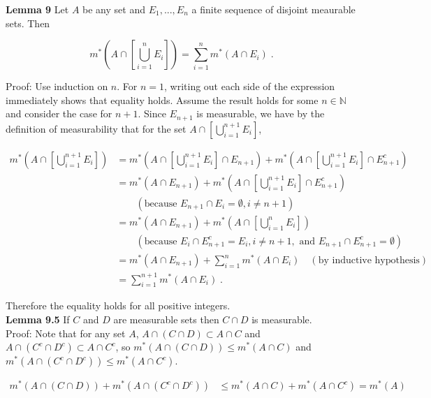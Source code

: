 \documentclass[a4paper]{article}
\begin{document}
{\bf Lemma 9} Let $A$ be any set and $E_1,..., E_n$ a finite sequence of disjoint meaurable sets. Then 

$$m^*\left(A\cap \left[\bigcup_{i=1}^n E_i\right]\right) =\sum_{i=1}^n m^*(A\cap E_i) \;. $$

Proof: Use induction on $n$. For $n = 1$, writing out each side of the expression immediately shows that equality holds. Assume the result holds for some $n \in \mathbb{N}$ and consider the case for $n+1$. Since $E_{n+1}$ is measurable, we have by the definition of measurability that for the set $A \cap \left[\bigcup_{i=1}^{n+1} E_i\right]$,

\begin{align*}
m^*\left(A\cap \left[\bigcup_{i=1}^{n+1} E_i\right]\right) &= m^*\left(A\cap \left[\bigcup_{i=1}^{n+1} E_i\right]\cap E_{n+1} \right) + m^*\left(A\cap \left[\bigcup_{i=1}^{n+1} E_i\right]\cap E_{n+1}^c \right)\\
&=m^*\left(A \cap E_{n+1} \right) + m^*\left(A\cap \left[\bigcup_{i=1}^{n+1} E_i\right]\cap E_{n+1}^c \right)\\
&\quad \quad (\text{because } E_{n+1} \cap E_i = \emptyset, i \neq n+1)\\
&=m^*\left(A \cap E_{n+1} \right) + m^*\left(A\cap \left[\bigcup_{i=1}^{n} E_i\right] \right)\\
&\quad \quad (\text{because } E_i \cap E_{n+1}^c = E_i, i\neq n+1, \text{ and } E_{n+1} \cap E_{n+1}^c = \emptyset )\\
&= m^*\left(A \cap E_{n+1} \right) +\sum_{i=1}^n m^*(A\cap E_i) \quad (\text{by inductive hypothesis})\\
&= \sum_{i=1}^{n+1} m^*(A\cap E_i) \;.
\end{align*}

Therefore the equality holds for all positive integers. \\

{\bf Lemma 9.5} If $C$ and $D$ are measurable sets then $C\cap D$ is measurable.\\

Proof: Note that for any set $A$, $A\cap (C \cap D) \subset A\cap C$ and $A \cap (C^c \cap D^c) \subset A \cap  C^c$, so $m^*(A\cap (C \cap D)) \leq m^*( A\cap C)$ and $m^*(A\cap (C^c\cap D^c)) \leq m^*( A\cap C^c)$.

\begin{align*}
m^*(A\cap (C \cap D))+ m^*(A\cap (C^c\cap D^c))
&\leq m^*(A \cap C)+ m^*( A\cap C^c)
= m^*(A)
\end{align*}
\end{document}
